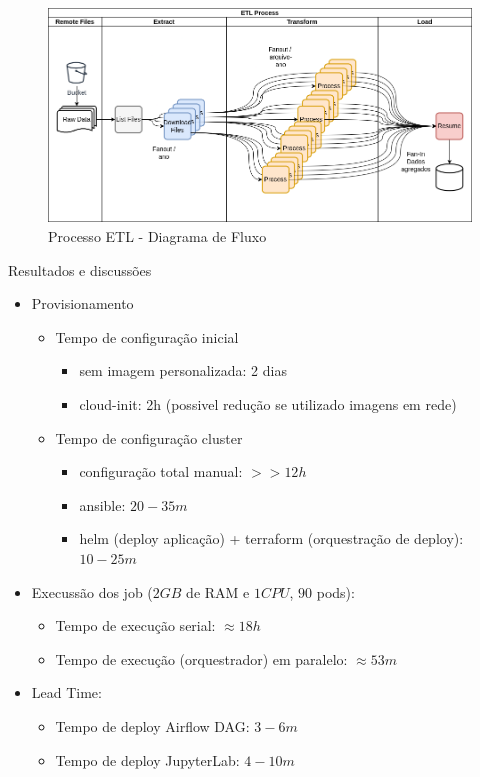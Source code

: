 \documentclass[10pt,brazil]{beamer}
\theoremstyle{definition}
\begin{document}
\begin{frame}[plain]
  \hspace*{-10mm}
  \begin{figure}
    \centering  
  \includegraphics[width=.85\paperwidth]{etl_process.png}
      \caption{Processo ETL - Diagrama de Fluxo}
  \end{figure}  
\end{frame}

\begin{frame}{Resultados e discussões}
  \begin{itemize}
    \item Provisionamento
    \begin{itemize}
      \item Tempo de configuração inicial
      \begin{itemize}
        \item sem imagem personalizada: 2 dias
        \item cloud-init: 2h (possivel redução  se utilizado imagens em rede)
      \end{itemize}
    \end{itemize}
    \begin{itemize}
      \item Tempo de configuração cluster
        \begin{itemize}
          \item configuração total manual: $ >> 12h$
          \item ansible: $20-35m$
          \item helm (deploy aplicação) + terraform (orquestração de deploy): $10-25m$
        \end{itemize}
    \end{itemize}
    \item Execussão dos job ($2GB$ de RAM e $1CPU$, $90$ pods):
    \begin{itemize}
        \item Tempo de execução serial: $\approx 18h$
        \item Tempo de execução (orquestrador) em paralelo: $\approx 53m$ 
    \end{itemize}
    \item Lead Time:
    \begin{itemize}
        \item Tempo de deploy Airflow DAG: $3-6m$
        \item Tempo de deploy JupyterLab: $4-10m$
    \end{itemize}
  \end{itemize}
\end{frame}
\end{document}
